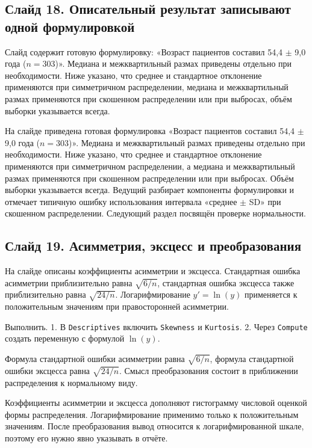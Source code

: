 \documentclass[11pt,a4paper]{article}
\begin{document}
\subsection*{Слайд 18. Описательный результат записывают одной формулировкой}
\begin{onslide}
Слайд содержит готовую формулировку: «Возраст пациентов составил 54,4 $\pm$ 9,0 года ($n = 303$)». Медиана и межквартильный размах приведены отдельно при необходимости. Ниже указано, что среднее и стандартное отклонение применяются при симметричном распределении, медиана и межквартильный размах применяются при скошенном распределении или при выбросах, объём выборки указывается всегда.
\end{onslide}
На слайде приведена готовая формулировка «Возраст пациентов составил 54,4 $\pm$ 9,0 года ($n = 303$)». Медиана и межквартильный размах приведены отдельно при необходимости. Ниже указано, что среднее и стандартное отклонение применяются при симметричном распределении, а медиана и межквартильный размах применяются при скошенном распределении или при выбросах. Объём выборки указывается всегда. Ведущий разбирает компоненты формулировки и отмечает типичную ошибку использования интервала «среднее $\pm$ SD» при скошенном распределении. Следующий раздел посвящён проверке нормальности.

\subsection*{Слайд 19. Асимметрия, эксцесс и преобразования}
\begin{onslide}
На слайде описаны коэффициенты асимметрии и эксцесса. Стандартная ошибка асимметрии приблизительно равна $\sqrt{6/n}$, стандартная ошибка эксцесса также приблизительно равна $\sqrt{24/n}$. Логарифмирование $y'=\ln(y)$ применяется к положительным значениям при правосторонней асимметрии.
\end{onslide}
\begin{jamovi}
Выполнить. 1. В \texttt{Descriptives} включить \texttt{Skewness} и \texttt{Kurtosis}. 2. Через \texttt{Compute} создать переменную с формулой $\ln(y)$.\par Формула стандартной ошибки асимметрии равна $\sqrt{6/n}$, формула стандартной ошибки эксцесса равна $\sqrt{24/n}$. Смысл преобразования состоит в приближении распределения к нормальному виду.
\end{jamovi}
Коэффициенты асимметрии и эксцесса дополняют гистограмму числовой оценкой формы распределения. Логарифмирование применимо только к положительным значениям. После преобразования вывод относится к логарифмированной шкале, поэтому его нужно явно указывать в отчёте.
\end{document}
